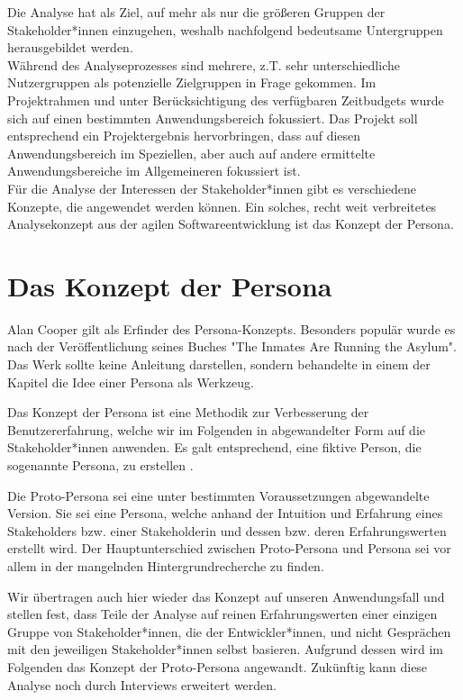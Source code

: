 \documentclass[paper=a4, parskip=half]{scrreprt}
\begin{document}
\vspace{0.5cm}

Die Analyse hat als Ziel, auf mehr als nur die größeren Gruppen der Stakeholder*innen einzugehen, weshalb nachfolgend bedeutsame Untergruppen herausgebildet werden. \\
Während des Analyseprozesses sind mehrere, z.T. sehr unterschiedliche Nutzergruppen als potenzielle Zielgruppen in Frage gekommen. Im Projektrahmen und unter Berücksichtigung des verfügbaren Zeitbudgets wurde sich auf einen bestimmten Anwendungsbereich fokussiert. Das Projekt soll entsprechend ein Projektergebnis hervorbringen, dass auf diesen Anwendungsbereich im Speziellen, aber auch auf andere ermittelte Anwendungsbereiche im Allgemeineren fokussiert ist. \\
Für die Analyse der Interessen der Stakeholder*innen gibt es verschiedene Konzepte, die angewendet werden können. Ein solches, recht weit verbreitetes Analysekonzept aus der agilen Softwareentwicklung ist das Konzept der Persona.

\chapter{Das Konzept der Persona} \label{Das Konzept der Persona}
Alan Cooper gilt als Erfinder des Persona-Konzepts. Besonders populär wurde es nach der Veröffentlichung seines Buches "The Inmates Are Running the Asylum".\cite{Cooper} Das Werk sollte keine Anleitung darstellen, sondern behandelte in einem der Kapitel die Idee einer Persona als Werkzeug. 

Das Konzept der Persona ist eine Methodik zur Verbesserung der Benutzererfahrung, welche wir im Folgenden in abgewandelter Form auf die Stakeholder*innen anwenden. Es galt entsprechend, eine fiktive Person, die sogenannte Persona,  zu erstellen \cite{PersonasMedium}.

Die Proto-Persona sei eine unter bestimmten Voraussetzungen abgewandelte Version. Sie sei eine Persona, welche anhand der Intuition und Erfahrung eines Stakeholders bzw. einer Stakeholderin und dessen bzw. deren Erfahrungswerten erstellt wird. Der Hauptunterschied zwischen Proto-Persona und Persona sei vor allem in der mangelnden Hintergrundrecherche zu finden. \cite{PersonasNewmedia}

Wir übertragen auch hier wieder das Konzept auf unseren Anwendungsfall und stellen fest, dass Teile der Analyse auf reinen Erfahrungswerten einer einzigen Gruppe von Stakeholder*innen, die der Entwickler*innen, und nicht Gesprächen mit den jeweiligen Stakeholder*innen selbst basieren.
Aufgrund dessen wird im Folgenden das Konzept der Proto-Persona angewandt.
Zukünftig kann diese Analyse noch durch Interviews erweitert werden.
\end{document}

